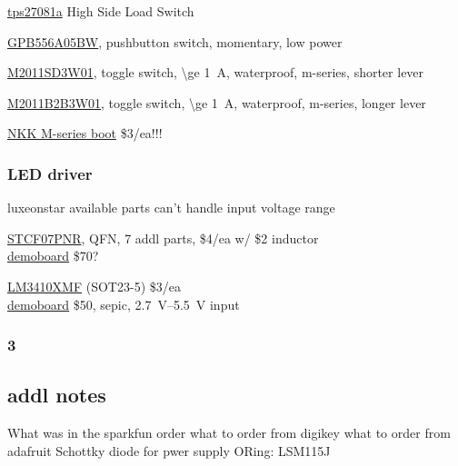 \documentclass[12pt]{article} %
\begin{document}
\href{http://www.digikey.com/product-search/en?pv7=2&k=tps27081a}{tps27081a} High Side Load Switch

\href{http://www.digikey.com/product-detail/en/GPB556A05BW/CWI284-ND/3193552}{GPB556A05BW}, pushbutton switch, momentary, low power

\href{http://www.digikey.com/product-detail/en/M2011SD3W01/360-3238-ND/1049303}{M2011SD3W01}, toggle switch, \SI{\ge 1}{\ampere}, waterproof, m-series, shorter lever

\href{http://www.digikey.com/product-detail/en/M2011B2B3W01/360-2824-ND/2105185}{M2011B2B3W01}, toggle switch, \SI{\ge 1}{\ampere}, waterproof, m-series, longer lever

\href{http://www.digikey.com/product-detail/en/AT4181/360-3019-ND/4507567}{NKK M-series boot} \$3/ea!!!
\subsubsection{LED driver}
\par luxeonstar available parts can't handle input voltage range
\par 
\begin{compactitem}
	\item \href{http://www.digikey.com/product-detail/en/STCF07PNR/497-10328-1-ND}{STCF07PNR}, QFN, 7 addl parts, 
		\$4/ea w/ \$2 inductor
		\\ \href{http://www.digikey.com/product-search/en/programmers-development-systems/evaluation-boards-led-drivers/2622547?k=STCF07}{demoboard} \$70?
	\item \href{http://www.digikey.com/product-detail/en/LM3410XMF%2FNOPB/LM3410XMF%2FNOPBCT-ND/1778507}{LM3410XMF} (SOT23-5) \$3/ea
		\\ \href{http://www.digikey.com/product-detail/en/LM3410XSDSEPEV/NOPB/LM3410XSDSEPEV%2FNOPB-ND/2506755} {demoboard} \$50, sepic, \SIrange{2.7}{5.5}{\volt} input
	\item 
	\item 
\end{compactitem}

\subsubsection{3}

\subsection{addl notes}
What was in the sparkfun order
what to order from digikey
what to order from adafruit
Schottky diode for pwer supply ORing: LSM115J
\end{document}
